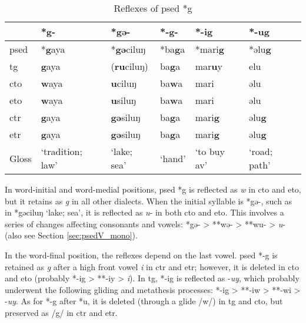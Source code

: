 \begin{table}[!htbp]
\centering
\caption{Reflexes of \acl{psed} *g}
\label{tab:psed_g}
\begin{tabular}{llllll}
\hline
           & *g-              & *gə-     & *-g-   & *-i\textbf{g}              & *-u\textbf{g}         \\ \hline
\acs{psed} & *\textbf{g}aya   & *\textbf{gə}ciluŋ & *ba\textbf{g}a  & *mari\textbf{g}            & *əlu\textbf{g}        \\ \hdashline
\acs{tg}   & \textbf{g}aya    & (\textbf{ru}ciluŋ)& ba\textbf{g}a   & mar\textbf{u}y             & elu          \\
\acs{cto}  & \textbf{w}aya    & \textbf{u}ciluŋ   & ba\textbf{w}a   & mari              & əlu          \\
\acs{eto}  & \textbf{w}aya    & \textbf{u}siluŋ   & ba\textbf{w}a   & mari                  & əlu             \\
\acs{ctr}  & \textbf{g}aya    & \textbf{gə}siluŋ  & ba\textbf{g}a   & mari\textbf{g}             & əlu\textbf{g}         \\
\acs{etr}  & \textbf{g}aya    & \textbf{gə}siluŋ  & ba\textbf{g}a   & mari\textbf{g}             & əlu\textbf{g}         \\ \hline
Gloss      & `tradition; law' & `lake; sea'       & `hand' & `to buy \acs{av}' & `road; path' \\ \hline
\end{tabular}
\end{table}

In word-initial and word-medial positions, \acl{psed} *g is reflected as \textit{w} in \acl{cto} and \acl{eto}, but it retains as \textit{g} in all other dialects. When the initial syllable is *gə-, such as in *gəciluŋ `lake; sea', it is reflected as \textit{u}- in both \acl{cto} and \acl{eto}. This involves a series of changes affecting consonants and vowels: *gə- > **wə- > **wu- > \textit{u}- (also see Section \ref{sec:psedV_mono}).

In the word-final position, the reflexes depend on the last vowel. \acl{psed} *-g is retained as \textit{g} after a high front vowel \textit{i} in \acl{ctr} and \acl{etr}; however, it is deleted in \acl{cto} and \acl{eto} (probably *-ig > **-iy > \textit{i}). In \acl{tg}, *-ig is reflected as -\textit{uy}, which probably underwent the following gliding and metathesis processes: *-ig > **-iw > **-wi > -\textit{uy}. As for *-g after *u, it is deleted (through a glide /w/) in \acl{tg} and \acl{cto}, but preserved as /g/ in \acl{ctr} and \acl{etr}. 

